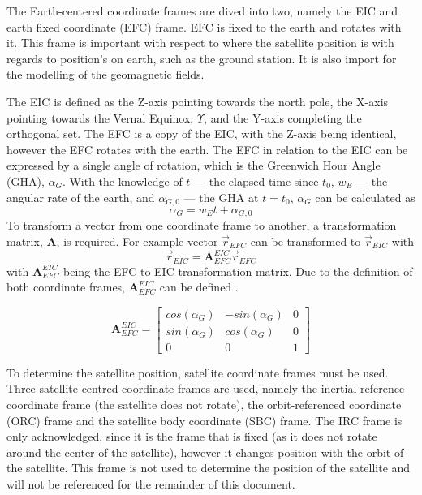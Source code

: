The Earth-centered coordinate frames are dived into two, namely the EIC and earth fixed coordinate (EFC) frame. EFC is fixed to the earth and rotates with it. This frame is important with respect to where the satellite position is with regards to position's on earth, such as the ground station. It is also import for the modelling of the geomagnetic fields. 


The EIC is defined as the Z-axis pointing towards the north pole, the X-axis pointing towards the Vernal Equinox, $\Upsilon$, and the Y-axis completing the orthogonal set. The EFC is a copy of the EIC, with the Z-axis being identical, however the EFC rotates with the earth. The EFC in relation to the EIC can be expressed by a single angle of rotation, which is the Greenwich Hour Angle (GHA), $\alpha_G$. With the knowledge of $t$ --- the elapsed time since $t_0$, $w_E$ --- the angular rate of the earth, and $\alpha_{G,0}$ --- the GHA at $t = t_0$, $\alpha_G$ can be calculated as 
\begin{equation}
\alpha_G = w_Et + \alpha_{G,0}
\end{equation}
To transform a vector from one coordinate frame to another, a transformation matrix, $\boldsymbol{A}$, is required. For example vector $\overrightarrow{r}_{EFC}$ can be transformed to $\overrightarrow{r}_{EIC}$ with 
\begin{equation}
\overrightarrow{r}_{EIC} = \boldsymbol{A}^{EIC}_{EFC}\overrightarrow{r}_{EFC}
\end{equation}
with $\boldsymbol{A}^{EIC}_{EFC}$ being the EFC-to-EIC transformation matrix. Due to the definition of both coordinate frames, $\boldsymbol{A}^{EIC}_{EFC}$ can be defined .

\begin{equation}
\boldsymbol{A}^{EIC}_{EFC} = 
\begin{bmatrix}
	cos(\alpha_G) & -sin(\alpha_G) & 0\\
	sin(\alpha_G) & cos(\alpha_G) & 0 \\
	0 & 0 & 1
\end{bmatrix}
\end{equation}

To determine the satellite position, satellite coordinate frames must be used. Three satellite-centred coordinate frames are used, namely the inertial-reference coordinate frame (the satellite does not rotate), the orbit-referenced coordinate (ORC) frame and the satellite body coordinate (SBC) frame. The IRC frame is only acknowledged, since it is the frame that is fixed (as it does not rotate around the center of the satellite), however it changes position with the orbit of the satellite. This frame is not used to determine the position of the satellite and will not be referenced for the remainder of this document.

